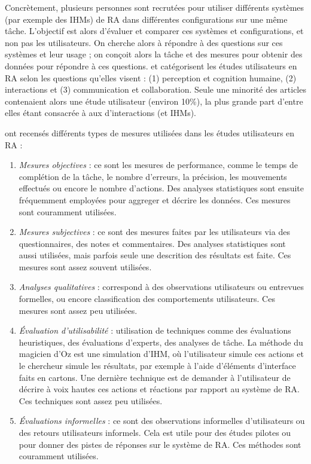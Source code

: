 Concrètement, plusieurs personnes sont recrutées pour utiliser différents systèmes (par exemple des IHMs) de RA dans différentes configurations sur une même tâche. L'objectif est alors d'évaluer et comparer ces systèmes et configurations, et non pas les utilisateurs. On cherche alors à répondre à des questions sur ces systèmes et leur usage ; on conçoit alors la tâche et des mesures pour obtenir des données pour répondre à ces questions. \cite{Swan2005} et \cite{Duenser2008} catégorisent les études utilisateurs en RA selon les questions qu'elles visent : (1) perception et cognition humaine, (2) interactions et (3) communication et collaboration. Seule une minorité des articles contenaient alors une étude utilisateur (environ 10\%), la plus grande part d'entre elles étant consacrée à aux d'interactions (et IHMs).

\cite{Duenser2008} ont recensés différents types de mesures utilisées dans les études utilisateurs en RA :
\begin{enumerate}
  \item \emph{Mesures objectives} : ce sont les mesures de performance, comme le temps de complétion de la tâche, le nombre d'erreurs, la précision, les mouvements effectués ou encore le nombre d'actions. Des analyses statistiques sont ensuite fréquemment employées pour aggreger et décrire les données. Ces mesures sont couramment utilisées.
  \item \emph{Mesures subjectives} : ce sont des mesures faites par les utilisateurs via des questionnaires, des notes et commentaires.  Des analyses statistiques sont aussi utilisées, mais parfois seule une descrition des résultats est faite. Ces mesures sont assez souvent utilisées.
  \item \emph{Analyses qualitatives} : correspond à des observations utilisateurs ou entrevues formelles, ou encore classification des comportements utilisateurs. Ces mesures sont assez peu utilisées.
  \item \emph{Évaluation d'utilisabilité} : utilisation de techniques comme des évaluations heuristiques, des évaluations d'experts, des analyses de tâche. La méthode du magicien d'Oz est une simulation d'IHM, où l'utilisateur simule ces actions et le chercheur simule les résultats, par exemple à l'aide d'éléments d'interface faits en cartons. Une dernière technique est de demander à l'utilisateur de décrire à voix hautes ces actions et réactions par rapport au système de RA. Ces techniques sont assez peu utilisées.
  \item \emph{Évaluations informelles} : ce sont des observations informelles d'utilisateurs ou des retours utilisateurs informels. Cela est utile pour des études pilotes ou pour donner des pistes de réponses sur le système de RA. Ces méthodes sont couramment utilisées.
\end{enumerate}

